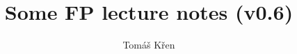 \documentclass[a4paper,oneside]{memoir}
\title{Some FP lecture notes (v0.6)}
\author{Tomáš Křen}
\begin{document}
\theoremstyle{plain} 
\newtheorem{theorem}{Theorem} 
\newtheorem{proposition}{Proposition} 
\newtheorem{lemma}{Lemma} 
\newtheorem{preLemma}{Pre-Lemma} 
\newtheorem*{corollary}{Corollary}

\theoremstyle{definition} 
\newtheorem*{definition}{Definition} 
\newtheorem*{preDefinition}{Pre-Definition} 
\newtheorem{conjecture}{Conjecture}
\newtheorem*{example}{Example} 

\theoremstyle{remark} 
\newtheorem*{remark}{Remark} 
\newtheorem*{note}{Note} 
\newtheorem{case}{Case}

\frontmatter
\mainmatter
\maketitle


\tableofcontents*

\newcommand{\red}[1]{{\color{red} #1}}



\newcommand{\sigmaPr}{\sigma^\prime}
\newcommand{\tauPr}{\tau^\prime}
\newcommand{\xPr}{x^\prime}
\newcommand{\nPr}{n^\prime}
\newcommand{\nPrr}{n^{\prime\prime}}
\newcommand{\nPrrr}{n^{\prime\prime\prime}}
\newcommand{\tausPr}{\tau_s^\prime}
\newcommand{\s}{\sigma}
\newcommand{\Th}{\theta}
\newcommand{\sPr}{\sigmaPr}
\newcommand{\thPr}{\theta^\prime}



\newcommand{\then}{\Rightarrow}
\newcommand{\E}[2]{(\exists #1)\ #2}
\newcommand{\A}[2]{(\forall #1)\ #2}
\newcommand{\Ain}[3]{(\forall #1 \in #2)\ #3}


\newcommand{\op}{\operatorname}

\newcommand{\ar}{\rightarrow}
\newcommand{\ap}[2]{(#1\,#2)}
\newcommand{\defi}{\coloneqq}
\newcommand{\defe}{\mathrel{\vcentcolon\equiv}}

\newcommand{\unaRule}[2]{\dfrac{#1}{#2}}
\newcommand{\binRule}[3]{\dfrac{#1 ~ ~ ~ ~ ~ ~ ~ #2}{#3}}
\newcommand{\triRule}[4]{\dfrac{#1 ~ ~ ~ ~ ~ ~ ~ #2 ~ ~ ~ ~ ~ ~ ~ #3}{#4}}
\newcommand{\isSub}[1]{#1\ \mathit{substitution}}
\newcommand{\MGU}[2]{\op{MGU}(#1,#2)}
\newcommand{\mgu}[1]{\op{MGU}(#1)}

\newcommand{\AX}{\textit{AX}\xspace}
\newcommand{\subAx}{\textit{SUB-AX}\xspace}
\newcommand{\mguMp}{\textit{MGU-MP}\xspace}
\newcommand{\abs}[1]{\lvert #1 \rvert}

\newcommand{\Pseudokod}[4]{
	\begin{figure}[!t]
	\removelatexerror
	\begin{algorithm}[H]
		\caption{\label{#4}#1}
		\DontPrintSemicolon
		\SetKwProg{Fn}{function}{}{}
		\Fn{#2}{#3}
	\end{algorithm}
	\end{figure}
}
\end{document}
